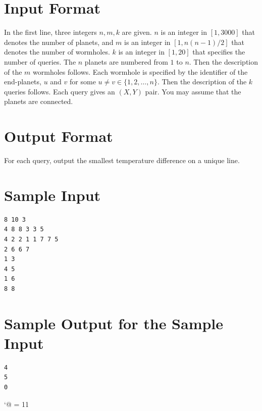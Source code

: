 \documentclass[a4paper,12pt]{article}
\begin{document}


\section*{Input Format}

In the first line, three integers $n, m, k$ are given. $n$ is an integer in $[1, 3000]$ that denotes the number of planets, and $m$ is an integer in $[1, n(n-1)/2]$ that denotes the number of wormholes. $k$ is an integer in $[1, 20]$ that specifies the number of queries. The $n$ planets are numbered from $1$ to $n$. Then the description of the $m$ wormholes follows. Each wormhole is specified by the identifier of the end-planets, $u$ and $v$ for some $u \ne v \in \{1, 2, \ldots, n\}$. Then the description of the $k$ queries follows. Each query gives an $(X, Y)$ pair. You may assume that the planets are connected.

\section*{Output Format}

For each query, output the smallest temperature difference on a unique line.

\section*{Sample Input}
\begin{verbatim}
8 10 3
4 8 8 3 3 5
4 2 2 1 1 7 7 5
2 6 6 7
1 3
4 5
1 6
8 8
\end{verbatim}

\section*{Sample Output for the Sample Input}
\begin{verbatim}
4
5
0
\end{verbatim}


\vfill \newpage

\begingroup
\catcode`@ = 11
\protected@write\@auxout{}{\string\newcount\n \n=\the\n}
\endgroup
\end{document}
